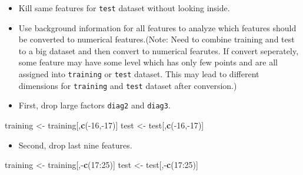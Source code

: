 \documentclass[]{article}
\newenvironment{Shaded}{\begin{snugshade}}{\end{snugshade}}
\newcommand{\KeywordTok}[1]{\textcolor[rgb]{0.13,0.29,0.53}{\textbf{{#1}}}}
\newcommand{\DecValTok}[1]{\textcolor[rgb]{0.00,0.00,0.81}{{#1}}}
\newcommand{\StringTok}[1]{\textcolor[rgb]{0.31,0.60,0.02}{{#1}}}
\newcommand{\OtherTok}[1]{\textcolor[rgb]{0.56,0.35,0.01}{{#1}}}
\newcommand{\NormalTok}[1]{{#1}}
\begin{document}
\begin{itemize}
  \begin{itemize}
  \itemsep1pt\parskip0pt
  \item
    Kill same features for \texttt{test} dataset without looking inside.
  \end{itemize}

\begin{Shaded}
\end{Shaded}

  \begin{itemize}
  \itemsep1pt\parskip0pt
  \item
    Use background information for all features to analyze which
    features should be converted to numerical features.(Note: Need to
    combine training and test to a big dataset and then convert to
    numerical fearutes. If convert seperately, some feature may have
    some level which has only few points and are all assigned into
    \texttt{training} or \texttt{test} dataset. This may lead to
    different dimensions for \texttt{training} and \texttt{test} dataset
    after conversion.)
  \item
    First, drop large factors \texttt{diag2} and \texttt{diag3}.
  \end{itemize}

\begin{Shaded}
\begin{Highlighting}[]
    \NormalTok{training <-}\StringTok{ }\NormalTok{training[,}\KeywordTok{c}\NormalTok{(-}\DecValTok{16}\NormalTok{,-}\DecValTok{17}\NormalTok{)]}
    \NormalTok{test <-}\StringTok{ }\NormalTok{test[,}\KeywordTok{c}\NormalTok{(-}\DecValTok{16}\NormalTok{,-}\DecValTok{17}\NormalTok{)]}
\end{Highlighting}
\end{Shaded}

  \begin{itemize}
  \itemsep1pt\parskip0pt
  \item
    Second, drop last nine features.
  \end{itemize}

\begin{Shaded}
\begin{Highlighting}[]
    \NormalTok{training <-}\StringTok{ }\NormalTok{training[,-}\KeywordTok{c}\NormalTok{(}\DecValTok{17}\NormalTok{:}\DecValTok{25}\NormalTok{)]}
    \NormalTok{test <-}\StringTok{ }\NormalTok{test[,-}\KeywordTok{c}\NormalTok{(}\DecValTok{17}\NormalTok{:}\DecValTok{25}\NormalTok{)]}
\end{Highlighting}
\end{Shaded}


\end{itemize}
\end{document}
